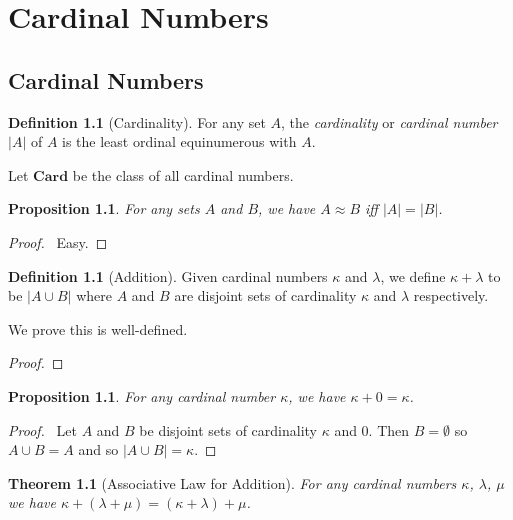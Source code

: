 \documentclass{book}
\let\qed\relax
\newtheorem{prop}[ax]{Proposition}
\newtheorem{thm}[ax]{Theorem}
\theoremstyle{definition}
\newtheorem{df}[ax]{Definition}
\begin{document}
\chapter{Cardinal Numbers}

\section{Cardinal Numbers}

\begin{df}[Cardinality]
For any set $A$, the \emph{cardinality} or \emph{cardinal number} $|A|$ of $A$ is the least ordinal equinumerous with $A$.

Let $\mathbf{Card}$ be the class of all cardinal numbers.
\end{df}

\begin{prop}
For any sets $A$ and $B$, we have $A \approx B$ iff $|A| = |B|$.
\end{prop}

\begin{proof}
\pf\ Easy. \qed
\end{proof}

\begin{df}[Addition]
Given cardinal numbers $\kappa$ and $\lambda$, we define $\kappa + \lambda$ to be $|A \cup B|$ where $A$ and $B$ are disjoint sets of cardinality $\kappa$ and $\lambda$ respectively.

We prove this is well-defined.
\end{df}

\begin{proof}
\pf
{}
\qed
\end{proof}

\begin{prop}
For any cardinal number $\kappa$, we have $\kappa + 0 = \kappa$.
\end{prop}

\begin{proof}
\pf\ Let $A$ and $B$ be disjoint sets of cardinality $\kappa$ and 0. Then $B = \emptyset$ so $A \cup B = A$ and so $|A \cup B| = \kappa$. \qed
\end{proof}

\begin{thm}[Associative Law for Addition]
For any cardinal numbers $\kappa$, $\lambda$, $\mu$ we have $\kappa + (\lambda + \mu) = (\kappa + \lambda) + \mu$.
\end{thm}
\end{document}
